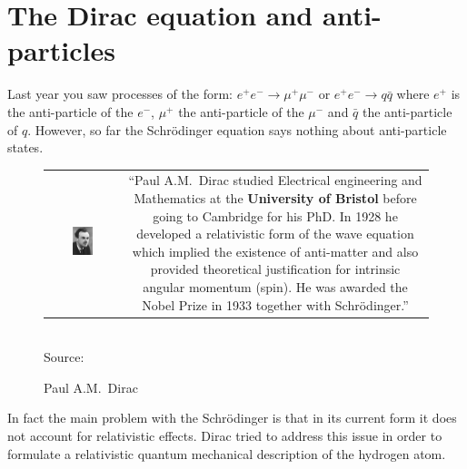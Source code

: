 \section{The Dirac equation and anti-particles}
Last year you saw processes of the form:
$e^+e^-\to \mu^+\mu^-$ or $e^+e^-\to q\bar{q}$ where $e^+$ is the anti-particle
of the $e^-$, $\mu^+$ the anti-particle of the $\mu^-$ and $\bar{q}$ the anti-particle of $q$. However, so far the Schr\"odinger equation says nothing about anti-particle states. 

\begin{figure}
\caption{Paul A.M.~Dirac}
\begin{tabular}{cc}
\parbox{0.32\textwidth}{
\includegraphics[width=0.3\textwidth]{fig/dirac/Dirac_4.jpg}
}&
\parbox{0.66\textwidth}{\textsf{\small
    ``Paul A.M.~Dirac studied Electrical engineering and Mathematics at the {\bf University of Bristol} before going to Cambridge for his PhD. In 1928 he developed a relativistic form of the wave equation which implied the existence of anti-matter and also provided theoretical justification for intrinsic angular momentum (spin). He was awarded the Nobel Prize in 1933 together with Schr\"odinger.'' 
}}
\end{tabular}
\\  \textsf{Source: }
\end{figure}

In fact the main problem with the Schr\"odinger is that in its current form it does not account for relativistic effects. Dirac tried to address this issue in order to formulate a relativistic quantum mechanical description of the hydrogen atom.



